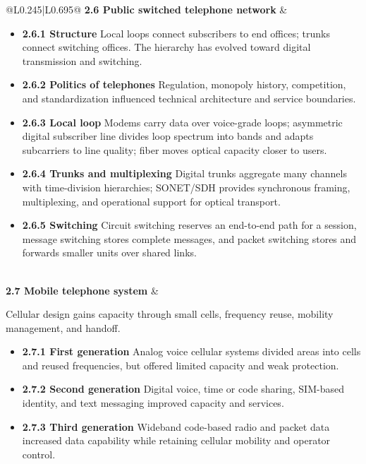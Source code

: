 \documentclass[10pt,letterpaper]{article}
\begin{document}
\begin{longtable}{@{}L{0.245\textwidth}|L{0.695\textwidth}@{}}
\textbf{2.6 Public switched telephone network} & \begin{minipage}[t]{\linewidth}\raggedright \begin{itemize}\item \textbf{2.6.1 Structure} Local loops connect subscribers to end offices; trunks connect switching offices. The hierarchy has evolved toward digital transmission and switching.\item \textbf{2.6.2 Politics of telephones} Regulation, monopoly history, competition, and standardization influenced technical architecture and service boundaries.\item \textbf{2.6.3 Local loop} Modems carry data over voice-grade loops; asymmetric digital subscriber line divides loop spectrum into bands and adapts subcarriers to line quality; fiber moves optical capacity closer to users.\item \textbf{2.6.4 Trunks and multiplexing} Digital trunks aggregate many channels with time-division hierarchies; SONET/SDH provides synchronous framing, multiplexing, and operational support for optical transport.\item \textbf{2.6.5 Switching} Circuit switching reserves an end-to-end path for a session, message switching stores complete messages, and packet switching stores and forwards smaller units over shared links.\end{itemize}\end{minipage} \\ \hline
{}\textbf{2.7 Mobile telephone system} & \begin{minipage}[t]{\linewidth}\raggedright Cellular design gains capacity through small cells, frequency reuse, mobility management, and handoff.\par\begin{itemize}\item \textbf{2.7.1 First generation} Analog voice cellular systems divided areas into cells and reused frequencies, but offered limited capacity and weak protection.\item \textbf{2.7.2 Second generation} Digital voice, time or code sharing, SIM-based identity, and text messaging improved capacity and services.\item \textbf{2.7.3 Third generation} Wideband code-based radio and packet data increased data capability while retaining cellular mobility and operator control.\end{itemize}\end{minipage} \\ \hline

\end{longtable}
\end{document}
